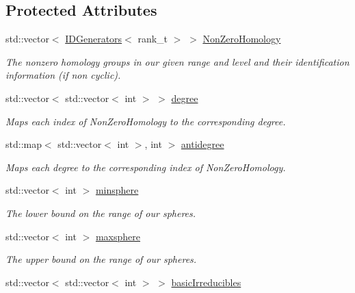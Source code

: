 \subsection*{Protected Attributes}
\begin{DoxyCompactItemize}
\item 
std\+::vector$<$ \hyperlink{classMackey_1_1IDGenerators}{I\+D\+Generators}$<$ rank\+\_\+t $>$ $>$ \hyperlink{classMackey_1_1MultiplicationTable_ad392b9570c511595a08642f5d54d20eb}{Non\+Zero\+Homology}
\begin{DoxyCompactList}\small\item\em The nonzero homology groups in our given range and level and their identification information (if non cyclic). \end{DoxyCompactList}\item 
std\+::vector$<$ std\+::vector$<$ int $>$ $>$ \hyperlink{classMackey_1_1MultiplicationTable_a9a0d2a2d8561e378e08fcf4929df2cf6}{degree}
\begin{DoxyCompactList}\small\item\em Maps each index of Non\+Zero\+Homology to the corresponding degree. \end{DoxyCompactList}\item 
std\+::map$<$ std\+::vector$<$ int $>$, int $>$ \hyperlink{classMackey_1_1MultiplicationTable_ac5749155e5531a3c728d8227caed63eb}{antidegree}
\begin{DoxyCompactList}\small\item\em Maps each degree to the corresponding index of Non\+Zero\+Homology. \end{DoxyCompactList}\item 
std\+::vector$<$ int $>$ \hyperlink{classMackey_1_1MultiplicationTable_a071f7d7c6cd1c75836b64ea8e9923b49}{minsphere}
\begin{DoxyCompactList}\small\item\em The lower bound on the range of our spheres. \end{DoxyCompactList}\item 
std\+::vector$<$ int $>$ \hyperlink{classMackey_1_1MultiplicationTable_a4355003c6be4a4f857eba151c8e5bcf6}{maxsphere}
\begin{DoxyCompactList}\small\item\em The upper bound on the range of our spheres. \end{DoxyCompactList}\item 
std\+::vector$<$ std\+::vector$<$ int $>$ $>$ \hyperlink{classMackey_1_1MultiplicationTable_af6896ea01c087e71533de423d7cf65ac}{basic\+Irreducibles}

\end{DoxyCompactItemize}
